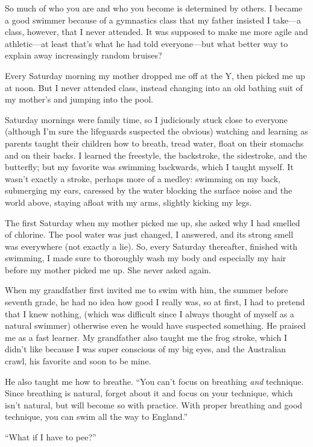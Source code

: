 So much of who you are and who you become is determined by others. I
became a good swimmer because of a gymnastics class that my father
insisted I take---a class, however, that I never attended. It was
supposed to make me more agile and athletic---at least that's what he
had told everyone---but what better way to explain away increasingly
random bruises?

Every Saturday morning my mother dropped me off at the Y, then picked me
up at noon. But I never attended class, instead changing into an old
bathing suit of my mother's and jumping into the pool.

Saturday mornings were family time, so I judiciously stuck close to
everyone (although I'm sure the lifeguards suspected the obvious)
watching and learning as parents taught their children how to breath,
tread water, float on their stomachs and on their backs. I learned the
freestyle, the backstroke, the sidestroke, and the butterfly; but my
favorite was swimming backwards, which I taught myself. It wasn't
exactly a stroke, perhaps more of a medley: swimming on my back,
submerging my ears, caressed by the water blocking the surface noise and
the world above, staying afloat with my arms, slightly kicking my legs.

The first Saturday when my mother picked me up, she asked why I had
smelled of chlorine. The pool water was just changed, I answered, and
its strong smell was everywhere (not exactly a lie). So, every Saturday
thereafter, finished with swimming, I made sure to thoroughly wash my
body and especially my hair before my mother picked me up. She never
asked again.

When my grandfather first invited me to swim with him, the summer before
seventh grade, he had no idea how good I really was, so at first, I had
to pretend that I knew nothing, (which was difficult since I always
thought of myself as a natural swimmer) otherwise even he would have
suspected something. He praised me as a fast learner. My grandfather
also taught me the frog stroke, which I didn't like because I was super
conscious of my big eyes, and the Australian crawl, his favorite and
soon to be mine.

He also taught me how to breathe. ``You can't focus on breathing
\emph{and} technique. Since breathing is natural, forget about it and
focus on your technique, which isn't natural, but will become so with
practice. With proper breathing and good technique, you can swim all the
way to England.''

``What if I have to pee?''

